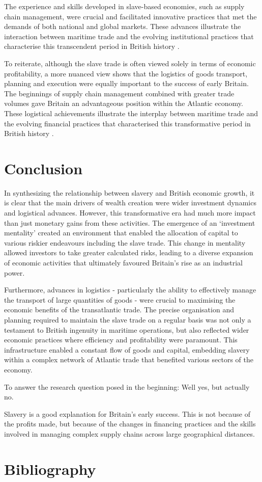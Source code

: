 \documentclass[a4paper,11pt]{article}
\begin{document}
The experience and skills developed in slave-based economies, such as supply chain management, were crucial and facilitated innovative practices that met the demands of both national and global markets. These advances illustrate the interaction between maritime trade and the evolving institutional practices that characterise this transcendent period in British history \citep{berghudson2021}.

To reiterate, although the slave trade is often viewed solely in terms of economic profitability, a more nuanced view shows that the logistics of goods transport, planning and execution were equally important to the success of early Britain. The beginnings of supply chain management combined with greater trade volumes gave Britain an advantageous position within the Atlantic economy. These logistical achievements illustrate the interplay between maritime trade and the evolving financial practices that characterised this transformative period in British history \citep{harley2015}.

\section{Conclusion}

In synthesizing the relationship between slavery and British economic growth, it is clear that the main drivers of wealth creation were wider investment dynamics and logistical advances. However, this transformative era had much more impact than just monetary gains from these activities. The emergence of an ‘investment mentality’ created an environment that enabled the allocation of capital to various riskier endeavours including the slave trade. This change in mentality allowed investors to take greater calculated risks, leading to a diverse expansion of economic activities that ultimately favoured Britain's rise as an industrial power.

Furthermore, advances in logistics - particularly the ability to effectively manage the transport of large quantities of goods - were crucial to maximising the economic benefits of the transatlantic trade. The precise organisation and planning required to maintain the slave trade on a regular basis was not only a testament to British ingenuity in maritime operations, but also reflected wider economic practices where efficiency and profitability were paramount. This infrastructure enabled a constant flow of goods and capital, embedding slavery within a complex network of Atlantic trade that benefited various sectors of the economy.

To answer the research question posed in the beginning: Well yes, but actually no.\citep{wellyes}

Slavery is a good explanation for Britain's early success. This is not because of the profits made, but because of the changes in financing practices and the skills involved in managing complex supply chains across large geographical distances.

\pagebreak

\section*{Bibliography}

\end{document}
